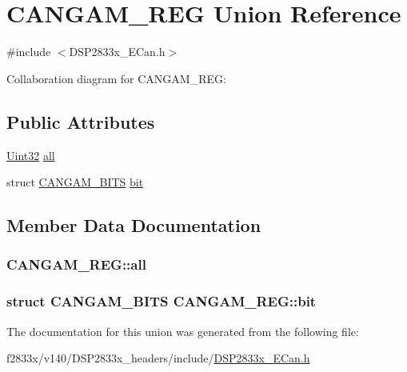 \hypertarget{union_c_a_n_g_a_m___r_e_g}{}\section{C\+A\+N\+G\+A\+M\+\_\+\+R\+E\+G Union Reference}
\label{union_c_a_n_g_a_m___r_e_g}


{\ttfamily \#include $<$D\+S\+P2833x\+\_\+\+E\+Can.\+h$>$}



Collaboration diagram for C\+A\+N\+G\+A\+M\+\_\+\+R\+E\+G\+:
\subsection*{Public Attributes}
\begin{DoxyCompactItemize}
\item 
\hyperlink{_d_s_p2833x___device_8h_aba99025e657f892beb7ff31cecf64653}{Uint32} \hyperlink{union_c_a_n_g_a_m___r_e_g_a94a8c58039bd0d3cd6d08e233e41638c}{all}
\item 
struct \hyperlink{struct_c_a_n_g_a_m___b_i_t_s}{C\+A\+N\+G\+A\+M\+\_\+\+B\+I\+T\+S} \hyperlink{union_c_a_n_g_a_m___r_e_g_a094843346af144bab6d8682efd71c13e}{bit}
\end{DoxyCompactItemize}


\subsection{Member Data Documentation}
\hypertarget{union_c_a_n_g_a_m___r_e_g_a94a8c58039bd0d3cd6d08e233e41638c}{}
\subsubsection[{all}]{ C\+A\+N\+G\+A\+M\+\_\+\+R\+E\+G\+::all}\label{union_c_a_n_g_a_m___r_e_g_a94a8c58039bd0d3cd6d08e233e41638c}
\hypertarget{union_c_a_n_g_a_m___r_e_g_a094843346af144bab6d8682efd71c13e}{}
\subsubsection[{bit}]{\setlength{\rightskip}{0pt plus 5cm}struct {\bf C\+A\+N\+G\+A\+M\+\_\+\+B\+I\+T\+S} C\+A\+N\+G\+A\+M\+\_\+\+R\+E\+G\+::bit}\label{union_c_a_n_g_a_m___r_e_g_a094843346af144bab6d8682efd71c13e}


The documentation for this union was generated from the following file\+:\begin{DoxyCompactItemize}
\item 
f2833x/v140/\+D\+S\+P2833x\+\_\+headers/include/\hyperlink{_d_s_p2833x___e_can_8h}{D\+S\+P2833x\+\_\+\+E\+Can.\+h}\end{DoxyCompactItemize}
